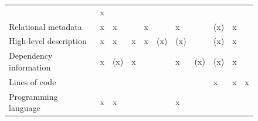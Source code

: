 \documentclass{article}
\begin{document}
\begin{figure}
\begin{tabular}{lllllllllll}
& x

\\
Relational metadata

& x

& x

& 

& x

& 

& x

& 

& (x)

& x

& 

\\
High-level description

& x

& x

& x

& x

& (x)

& (x)

& 

& (x)

& x

& 

\\
Dependency information

& x

& (x)

& x

& 

& 

& x

& (x)

& (x)

& x

& 

\\
Lines of code

& 

& 

& 

& 

& 

& 

& 

& x

& x

& x

\\
Programming language

& x

& x

& 

& 

& 

& x


\end{tabular}
\end{figure}
\end{document}
